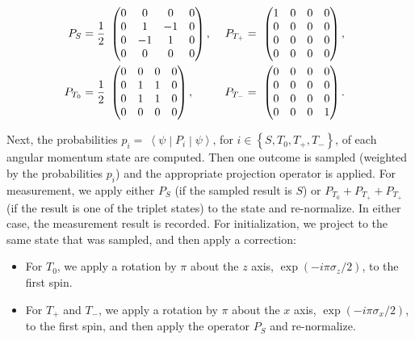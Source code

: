 \documentclass[aps,prl,twocolumn,superscriptaddress,nobibnotes,10pt,floatfix]{revtex4-2}
\begin{document}
\begin{align}
	P_{S} &= \frac{1}{2}\ \begin{pmatrix}
		0 & 0 & 0 & 0 \\
		0 & 1 & - 1 & 0 \\
		0 & - 1 & 1 & 0 \\
		0 & 0 & 0 & 0
	\end{pmatrix},&
	P_{T_{+}} &= \ \begin{pmatrix}
		1 & 0 & 0 & 0 \\
		0 & 0 & 0 & 0 \\
		0 & 0 & 0 & 0 \\
		0 & 0 & 0 & 0
	\end{pmatrix},&
	\notag\\
	P_{T_{0}} &= \frac{1}{2}\ \begin{pmatrix}
		0 & 0 & 0 & 0 \\
		0 & 1 & 1 & 0 \\
		0 & 1 & 1 & 0 \\
		0 & 0 & 0 & 0
	\end{pmatrix},&
	\ P_{T_{-}} &= \ \begin{pmatrix}
		0 & 0 & 0 & 0 \\
		0 & 0 & 0 & 0 \\
		0 & 0 & 0 & 0 \\
		0 & 0 & 0 & 1
	\end{pmatrix}.
\end{align}

Next, the probabilities \(p_{i} = \ \left\langle \psi \middle| P_{i} \middle| \psi \right\rangle\), for \(i \in \left\{ S,T_{0},T_{+},T_{-} \right\}\), of each angular momentum state are computed.
Then one outcome is sampled (weighted by the probabilities \(p_{i}\)) and the appropriate projection operator is applied.
For measurement, we apply either \(P_{S}\) (if the sampled result is \(S\)) or \(P_{T_{0}} + P_{T_{+}} + P_{T_{+}}\) (if the result is one of the triplet states) to the state and re-normalize.
In either case, the measurement result is recorded.
For initialization, we project to the same state that was sampled, and then apply a correction:

\begin{itemize}
	\item
	For \(T_{0}\), we apply a rotation by \(\pi\) about the \(z\) axis, \(\exp\left( - i\pi\sigma_{z}\text{/}2 \right)\), to the first spin.
	\item
	For \(T_{+}\) and \(T_{-}\), we apply a rotation by \(\pi\) about the \(x\) axis, \(\exp\left( - i\pi\sigma_{x}\text{/}2 \right)\), to the first spin, and then apply the operator \(P_{S}\) and re-normalize.
\end{itemize}
\end{document}
